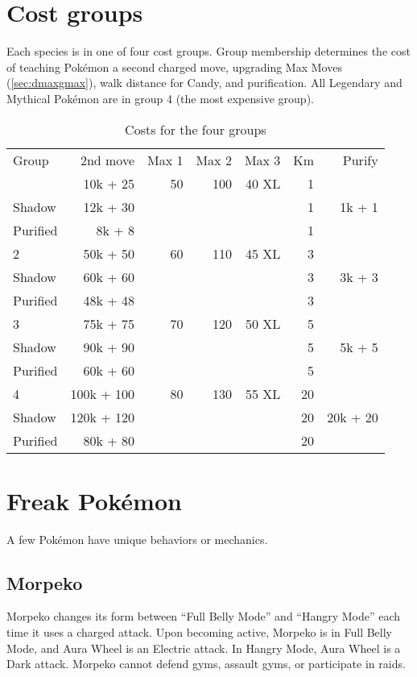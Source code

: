 \section{Cost groups\label{sec:costgroups}}
Each species is in one of four cost groups.
Group membership determines the cost of teaching Pokémon a second charged move,
  upgrading Max Moves (\autoref{sec:dmaxgmax}),
  walk distance for Candy,
  and purification.
All Legendary and Mythical Pokémon are in group 4 (the most expensive group).
\begin{table}
\centering
\begin{tabular}{lrrrrrr}
  Group & 2nd move   & Max 1 & Max 2 & Max 3 & Km & Purify\\
\Midrule
      1 & 10k + 25   & 50    & 100   & 40 XL & 1  &       \\
  Shadow& 12k + 30   &       &       &       & 1  & 1k + 1\\
Purified& 8k + 8   &       &       &       & 1  &         \\
      2 & 50k + 50   & 60    & 110   & 45 XL & 3  &       \\
  Shadow& 60k + 60   &       &       &       & 3  & 3k + 3\\
  Purified& 48k + 48   &       &       &       & 3  &     \\
      3 & 75k + 75   & 70    & 120   & 50 XL & 5  &       \\
  Shadow& 90k + 90   &       &       &       & 5  & 5k + 5\\
  Purified & 60k + 60 &   &    &   & 5 &                  \\
      4 & 100k + 100 & 80    & 130   & 55 XL & 20 &       \\
  Shadow& 120k + 120 &       &       &       & 20 & 20k + 20\\
Purified& 80k + 80 &   &    &   & 20 & \\
\end{tabular}
  \caption{Costs for the four groups\label{table:costs}}
\end{table}

\section{Freak Pokémon\label{sec:freaks}}
A few Pokémon have unique behaviors or mechanics.

\subsection{Morpeko\label{subsec:morpeko}}
Morpeko changes its form between ``Full Belly Mode'' and ``Hangry Mode''
  each time it uses a charged attack.
Upon becoming active, Morpeko is in Full Belly Mode, and Aura Wheel is an Electric attack.
In Hangry Mode, Aura Wheel is a Dark attack.
Morpeko cannot defend gyms, assault gyms, or participate in raids.

